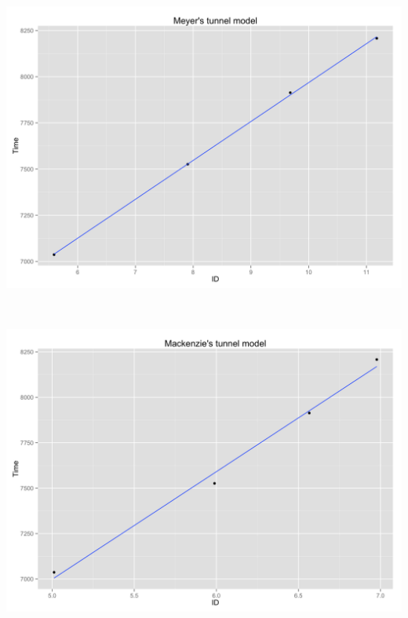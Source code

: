 \begin{minipage}{\linewidth}
	\begin{minipage}[t]{.45\linewidth}
		\includegraphics[width=\textwidth]{images/plots/plot_model_tunnel_meyer}
		\label{fig:meyer_tunnel_line}
	\end{minipage}
	\begin{minipage}[b]{0.1\linewidth}
	~
	\end{minipage}
	\begin{minipage}[t]{0.45\linewidth}
		\includegraphics[width=\textwidth]{images/plots/plot_model_tunnel_mackenzie}
		\label{fig:mackenzie_tunnel_line}
	\end{minipage}
\end{minipage}
